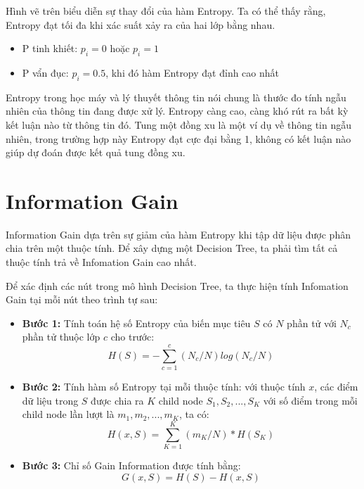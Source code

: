 Hình vẽ trên biểu diễn sự thay đổi của hàm Entropy. Ta có thể thấy rằng, Entropy đạt tối đa khi xác suất xảy ra của hai lớp bằng nhau.

\begin{itemize}
    \item P tinh khiết: $p_i=0$ hoặc $p_i=1$
    \item P vẩn đục: $p_i=0.5$, khi đó hàm Entropy đạt đỉnh cao nhất
\end{itemize}

Entropy trong học máy và lý thuyết thông tin nói chung là thước đo tính ngẫu nhiên của thông tin đang được xử lý. Entropy càng cao, càng khó rút ra bất kỳ kết luận nào từ thông tin đó. Tung một đồng xu là một ví dụ về thông tin ngẫu nhiên, trong trường hợp này Entropy đạt cực đại bằng 1, không có kết luận nào giúp dự đoán được kết quả tung đồng xu.

\section{Information Gain}
Information Gain dựa trên sự giảm của hàm Entropy khi tập dữ liệu được phân chia trên một thuộc tính. Để xây dựng một Decision Tree, ta phải tìm tất cả thuộc tính trả về Infomation Gain cao nhất.

Để xác định các nút trong mô hình Decision Tree, ta thực hiện tính Infomation Gain tại mỗi nút theo trình tự sau:

\begin{itemize}
    \item \textbf{Bước 1:} Tính toán hệ số Entropy của biến mục tiêu $S$ có $N$ phần tử với $N_c$ phần tử thuộc lớp $c$ cho trước:
    \begin{equation*}
        H(S) = -\sum_{c=1}^{c}(N_c/N)log(N_c/N)
    \end{equation*}
    
    \item \textbf{Bước 2:} Tính hàm số Entropy tại mỗi thuộc tính: với thuộc tính $x$, các điểm dữ liệu trong $S$ được chia ra $K$ child node $S_1, S_2,..., S_K$ với số điểm trong mỗi child node lần lượt là $m_1, m_2,..., m_K$, ta có:
    \begin{equation*}
        H(x, S) = \sum_{K=1}^{K}(m_K/N)*H(S_K)
    \end{equation*}
    
    \item \textbf{Bước 3:} Chỉ số Gain Information được tính bằng:
    \begin{equation*}
        G(x, S) = H(S) - H(x, S)
    \end{equation*}
\end{itemize}

